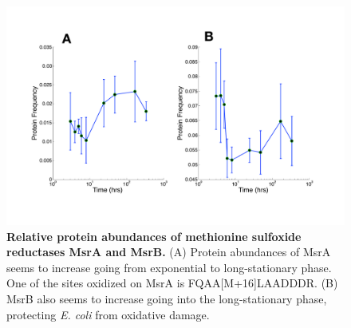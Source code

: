 \documentclass[12pt]{article}
\begin{document}
\clearpage
\begin{figure}[p]
\centerline{\includegraphics[width=8in]{Figures/Ecoli_MsrAB_MODa.pdf}}
\caption{\label{fig:MsrAB}\textbf{Relative protein abundances of methionine sulfoxide reductases MsrA and MsrB.} (A) Protein abundances of MsrA seems to increase going from exponential to long-stationary phase. One of the sites oxidized on MsrA is FQAA[M+16]LAADDDR. (B) MsrB also seems to increase going into the long-stationary phase, protecting \emph{E. coli} from oxidative damage.}
\end{figure}

\clearpage
\end{document}
